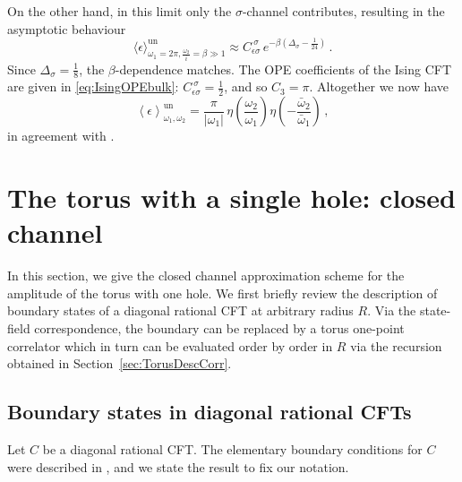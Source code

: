 \documentclass[11pt,a4paper]{article}
\numberwithin{equation}{section}
\begin{document}
\noindent 
On the other hand, in this limit only the $\sigma$-channel contributes, resulting in the asymptotic behaviour
%
\begin{equation}
    \big\langle \epsilon
    \big\rangle^\mathrm{un}_{\omega_1=2\pi,\frac{\omega_2}{i}=\beta\gg 1} 
    \approx 
    C_{\epsilon\sigma}^{~\sigma} \, e^{-\beta\left(\Delta_\sigma-\frac{1}{24}\right)}\,.
\end{equation}
%
Since $\Delta_\sigma = \frac18$, the $\beta$-dependence matches.
The OPE coefficients of the Ising CFT are given in \eqref{eq:IsingOPEbulk}:
$C_{\epsilon\sigma}^{~\sigma} = \frac12$, and so $C_3= \pi$. Altogether we now have
%
\begin{equation}\label{eq:eps-1pt-final}
     \left\langle \epsilon \right\rangle_{\omega_1,\omega_2}^\mathrm{un} = \frac{\pi}{|\omega_1|}\, \eta\!\left(\frac{\omega_2}{\omega_1}\right) \eta\!\left(-\frac{\bar{\omega}_2}{\bar{\omega}_1}\right) \,,
\end{equation}
in agreement with \cite[Eqn.\,(3.13)]{DiFrancesco:1987ez}.

\section{The torus with a single hole: closed channel}\label{sec:torus-closed}

In this section, we give the closed channel approximation scheme for the amplitude of the torus with one hole. We first briefly review the description of boundary states of a diagonal rational CFT at arbitrary radius $R$. Via the state-field correspondence, the boundary can be replaced by a torus one-point correlator which in turn can be evaluated order by order in $R$ via the recursion obtained in Section~\ref{sec:TorusDescCorr}.

\subsection{Boundary states in diagonal rational CFTs}\label{sec:BSdiag}

Let $C$ be a diagonal rational CFT. 
The elementary boundary conditions for $C$ were described in \cite{Cardy:1989ir}, and we state the result to fix our notation. 
\end{document}
